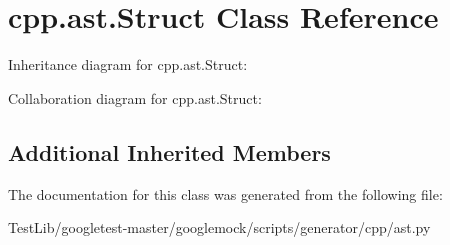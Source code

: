 \hypertarget{classcpp_1_1ast_1_1Struct}{}\section{cpp.\+ast.\+Struct Class Reference}
\label{classcpp_1_1ast_1_1Struct}


Inheritance diagram for cpp.\+ast.\+Struct\+:


Collaboration diagram for cpp.\+ast.\+Struct\+:
\subsection*{Additional Inherited Members}


The documentation for this class was generated from the following file\+:\begin{DoxyCompactItemize}
\item 
Test\+Lib/googletest-\/master/googlemock/scripts/generator/cpp/ast.\+py\end{DoxyCompactItemize}
